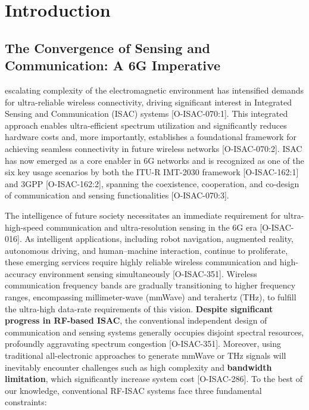 \section{Introduction}
\label{sec:introduction}

\subsection{The Convergence of Sensing and Communication: A 6G Imperative}

 escalating complexity of the electromagnetic environment has intensified demands for ultra-reliable wireless connectivity, driving significant interest in Integrated Sensing and Communication (ISAC) systems [O-ISAC-070:1]. This integrated approach enables ultra-efficient spectrum utilization and significantly reduces hardware costs and, more importantly, establishes a foundational framework for achieving seamless connectivity in future wireless networks [O-ISAC-070:2]. ISAC has now emerged as a core enabler in 6G networks and is recognized as one of the six key usage scenarios by both the ITU-R IMT-2030 framework [O-ISAC-162:1] and 3GPP [O-ISAC-162:2], spanning the coexistence, cooperation, and co-design of communication and sensing functionalities [O-ISAC-070:3].

The intelligence of future society necessitates an immediate requirement for ultra-high-speed communication and ultra-resolution sensing in the 6G era [O-ISAC-016]. As intelligent applications, including robot navigation, augmented reality, autonomous driving, and human--machine interaction, continue to proliferate, these emerging services require highly reliable wireless communication and high-accuracy environment sensing simultaneously [O-ISAC-351]. Wireless communication frequency bands are gradually transitioning to higher frequency ranges, encompassing millimeter-wave (mmWave) and terahertz (THz), to fulfill the ultra-high data-rate requirements of this vision. \textbf{Despite significant progress in RF-based ISAC}, the conventional independent design of communication and sensing systems generally occupies disjoint spectral resources, profoundly aggravating spectrum congestion [O-ISAC-351]. Moreover, using traditional all-electronic approaches to generate mmWave or THz signals will inevitably encounter challenges such as high complexity and \textbf{bandwidth limitation}, which significantly increase system cost [O-ISAC-286]. To the best of our knowledge, conventional RF-ISAC systems face three fundamental constraints:

